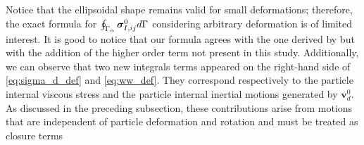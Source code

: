 Notice that the ellipsoidal shape remains valid for small deformations; therefore, the exact formula for $\oint_{\Gamma_{\alpha}} \bm\sigma_{I,ij}^0 d\Gamma$ considering arbitrary deformation is of limited interest. 
It is good to notice that our formula agrees with the one derived by \citet{lhuillier1987phenomenology} but with the addition of the higher order term not present in this study. 
Additionally, we can observe that two new integrals terms appeared on the right-hand side of \ref{eq:sigma_d_def}  and \ref{eq:ww_def}. 
They correspond respectively to the particle internal viscous stress and the particle internal inertial motions generated by $\textbf{v}_d^0$.
As discussed in the preceding subsection, these contributions arise from motions that are independent of particle deformation and rotation and must be treated as closure terms



